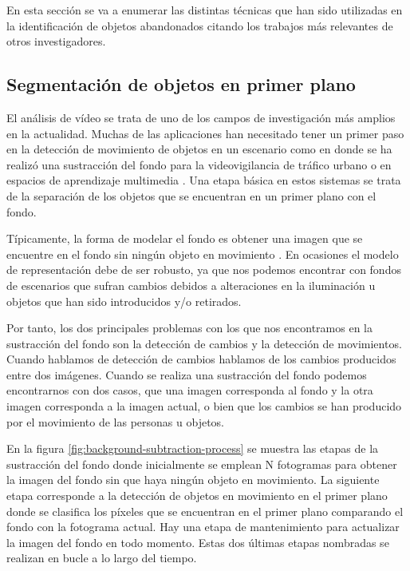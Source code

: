 En esta sección se va a enumerar las distintas técnicas que han sido utilizadas en la identificación de objetos abandonados citando los trabajos más relevantes de otros investigadores.

\subsection{Segmentación de objetos en primer plano}
\label{subsec:tecnicas-segmentacion-obj-primer-plano}

El análisis de vídeo se trata de uno de los campos de investigación más amplios en la actualidad. Muchas de las aplicaciones han necesitado tener un primer paso en la detección de movimiento de objetos en un escenario como en \cite{cheung2005robust} donde se ha realizó una sustracción del fondo para la videovigilancia de tráfico urbano o en espacios de aprendizaje multimedia \cite{4381122}. Una etapa básica en estos sistemas se trata de la separación de los objetos que se encuentran en un primer plano con el fondo.

Típicamente, la forma de modelar el fondo es obtener una imagen que se encuentre en el fondo sin ningún objeto en movimiento \cite{BOUWMANS201431}. En ocasiones el modelo de representación debe de ser robusto, ya que nos podemos encontrar con fondos de escenarios que sufran cambios debidos a alteraciones en la iluminación u objetos que han sido introducidos y/o retirados.

Por tanto, los dos principales problemas con los que nos encontramos en la sustracción del fondo son la detección de cambios y la detección de movimientos. Cuando hablamos de detección de cambios hablamos de los cambios producidos entre dos imágenes. Cuando se realiza una sustracción del fondo podemos encontrarnos con dos casos, que una imagen corresponda al fondo y la otra imagen corresponda a la imagen actual, o bien que los cambios se han producido por el movimiento de las personas u objetos.

En la figura \ref{fig:background-subtraction-process} se muestra las etapas de la sustracción del fondo donde inicialmente se emplean N fotogramas para obtener la imagen del fondo sin que haya ningún objeto en movimiento. La siguiente etapa corresponde a la detección de objetos en movimiento en el primer plano donde se clasifica los píxeles que se encuentran en el primer plano comparando el fondo con la fotograma actual. Hay una etapa de mantenimiento para actualizar la imagen del fondo en todo momento. Estas dos últimas etapas nombradas se realizan en bucle a lo largo del tiempo.


